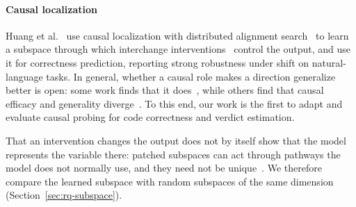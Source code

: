 \paragraph{Causal localization}
Huang et al.~\cite{Huang2025Internal} use causal localization 
with distributed alignment search~\cite{GeigerWPIG24DAS} to learn a subspace through which interchange interventions~\cite{Geiger2021CausalAbstractions} control the output, and use it for correctness prediction,  reporting strong robustness under shift on natural-language tasks. 
In general, whether a causal role makes a direction generalize better is open: some work finds that it does~\cite{marks2024geometry,mallen2024quirky}, while others find that causal efficacy and generality diverge~\cite{ying2026truthfulness}.
To this end, our work is the first to adapt and evaluate causal probing for code correctness and verdict estimation.

That an intervention changes the output does not by itself show that the model represents the variable there: patched subspaces can act through pathways the model does not normally use, and they need not be unique~\cite{makelov2024illusion,grant2025divergent,meloux2025everything}. We therefore compare the learned subspace with random subspaces of the same dimension %
(Section~\ref{sec:rq-subspace}). 





